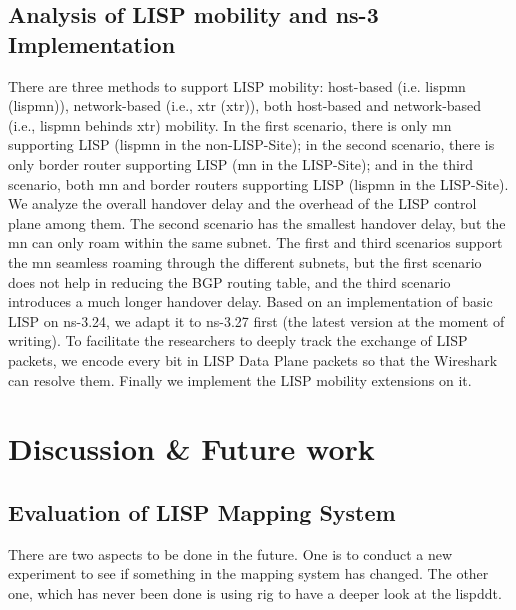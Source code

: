 \subsection{Analysis of LISP mobility and ns-3 Implementation}
There are three methods to support LISP mobility: host-based (i.e. \acrlong{lispmn} (\acrshort{lispmn})), network-based (i.e., \acrlong{xtr} (\acrshort{xtr})), both host-based and network-based (i.e., \acrshort{lispmn} behinds \acrshort{xtr}) mobility. %
In the first scenario, there is only \acrshort{mn} supporting LISP (\acrshort{lispmn} in the non-LISP-Site); in the second scenario, there is only border router supporting LISP (\acrshort{mn} in the LISP-Site); and in the third scenario, both \acrshort{mn} and border routers supporting LISP (\acrshort{lispmn} in the LISP-Site). We analyze the overall handover delay and the overhead of the LISP control plane among them. The second scenario has the smallest handover delay, but the \acrshort{mn} can only roam within the same subnet. The first and third scenarios support the \acrshort{mn} seamless roaming through the different subnets, but the first scenario does not help in reducing the BGP routing table, and the third scenario introduces a much longer handover delay. Based on an implementation of basic LISP on ns-3.24, we adapt it to ns-3.27 first (the latest version at the moment of writing). To facilitate the researchers to deeply track the exchange of LISP packets, we encode every bit in LISP Data Plane packets so that the Wireshark can resolve them. Finally we implement the LISP mobility extensions on it.


\section{Discussion \& Future work}

\subsection{Evaluation of LISP Mapping System}
There are two aspects to be done in the future. One is to conduct a new experiment to see if something in the mapping system has changed. The other one, which has never been done is using \acrfull{rig} to have a deeper look at the \acrfull{lispddt}.


